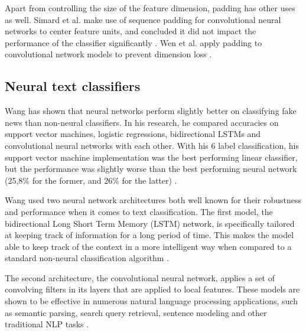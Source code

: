 Apart from controlling the size of the feature dimension, padding has other uses as well. 
Simard et al. make use of sequence padding for convolutional neural networks to center feature units, and concluded it did not impact the performance of the classifier significantly \cite{simard2003}. 
Wen et al. apply padding to convolutional network models to prevent dimension loss \cite{wen2018}. 

\subsection{Neural text classifiers}
Wang has shown that neural networks perform slightly better on classifying fake news than non-neural classifiers. 
In his research, he compared accuracies on support vector machines, logistic regressions, bidirectional LSTMs and convolutional neural networks with each other.
With his 6 label classification, his support vector machine implementation was the best performing linear classifier, but the performance was slightly worse than the best performing neural network (25,8\% for the former, and 26\% for the latter) \cite{wang2018}.

Wang used two neural network architectures both well known for their robustness and performance when it comes to text classification. 
The first model, the bidirectional Long Short Term Memory (LSTM) network, is specifically tailored at keeping track of information for a long period of time. 
This makes the model able to keep track of the context in a more intelligent way when compared to a standard non-neural classification algorithm \cite{olah2015}. 

The second architecture, the convolutional neural network, applies a set of convolving filters in its layers that are applied to local features. 
These models are shown to be effective in numerous natural language processing applications, such as semantic parsing, search query retrieval, sentence modeling and other traditional NLP tasks \cite{kim2014}.  